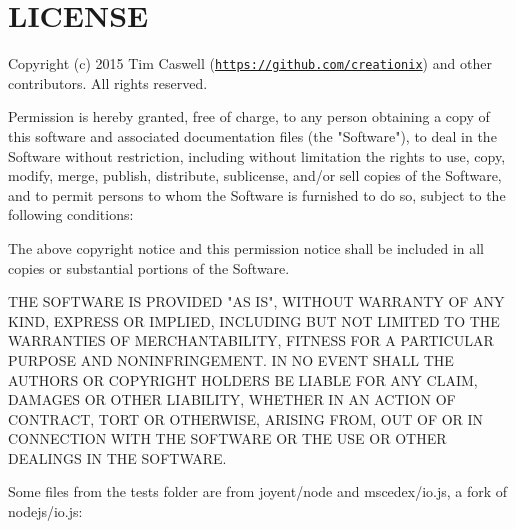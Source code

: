 \chapter{LICENSE }
\hypertarget{md__c_1_2_users_2saket_2_one_drive_2_desktop_2e_pathshala_2epathshala-_web_2node__modules_2http-parser-js_2_l_i_c_e_n_s_e}{}\label{md__c_1_2_users_2saket_2_one_drive_2_desktop_2e_pathshala_2epathshala-_web_2node__modules_2http-parser-js_2_l_i_c_e_n_s_e}
Copyright (c) 2015 Tim Caswell (\href{https://github.com/creationix}{\texttt{https\+://github.\+com/creationix}}) and other contributors. All rights reserved.

Permission is hereby granted, free of charge, to any person obtaining a copy of this software and associated documentation files (the "{}\+Software"{}), to deal in the Software without restriction, including without limitation the rights to use, copy, modify, merge, publish, distribute, sublicense, and/or sell copies of the Software, and to permit persons to whom the Software is furnished to do so, subject to the following conditions\+:

The above copyright notice and this permission notice shall be included in all copies or substantial portions of the Software.

THE SOFTWARE IS PROVIDED "{}\+AS IS"{}, WITHOUT WARRANTY OF ANY KIND, EXPRESS OR IMPLIED, INCLUDING BUT NOT LIMITED TO THE WARRANTIES OF MERCHANTABILITY, FITNESS FOR A PARTICULAR PURPOSE AND NONINFRINGEMENT. IN NO EVENT SHALL THE AUTHORS OR COPYRIGHT HOLDERS BE LIABLE FOR ANY CLAIM, DAMAGES OR OTHER LIABILITY, WHETHER IN AN ACTION OF CONTRACT, TORT OR OTHERWISE, ARISING FROM, OUT OF OR IN CONNECTION WITH THE SOFTWARE OR THE USE OR OTHER DEALINGS IN THE SOFTWARE.

Some files from the tests folder are from joyent/node and mscedex/io.\+js, a fork of nodejs/io.\+js\+:


